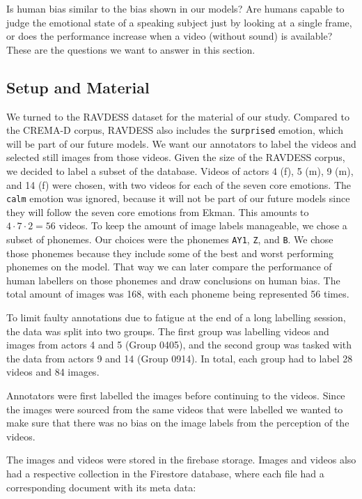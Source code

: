 Is human bias similar to the bias shown in our models? Are humans capable to judge the emotional state of a speaking subject just by looking at a single frame, or does the performance increase when a video (without sound) is available? These are the questions we want to answer in this section.

\subsection{Setup and Material}
We turned to the RAVDESS dataset \cite{livingstone2018ryerson} for the material of our study. Compared to the CREMA-D corpus, RAVDESS also includes the \texttt{surprised} emotion, which will be part of our future models. We want our annotators to label the videos and selected still images from those videos. Given the size of the RAVDESS corpus, we decided to label a subset of the database. Videos of actors 4 (f), 5 (m), 9 (m), and 14 (f) were chosen, with two videos for each of the seven core emotions. The \texttt{calm} emotion was ignored, because it will not be part of our future models since they will follow the seven core emotions from Ekman. This amounts to $4 \cdot 7 \cdot 2 = 56$ videos. To keep the amount of image labels manageable, we chose a subset of phonemes. Our choices were the phonemes \texttt{AY1}, \texttt{Z}, and \texttt{B}. We chose those phonemes because they include some of the best and worst performing phonemes on the model. That way we can later compare the performance of human labellers on those phonemes and draw conclusions on human bias. The total amount of images was 168, with each phoneme being represented 56 times.

To limit faulty annotations due to fatigue at the end of a long labelling session, the data was split into two groups. The first group was labelling videos and images from actors 4 and 5 (Group 0405), and the second group was tasked with the data from actors 9 and 14 (Group 0914). In total, each group had to label 28 videos and 84 images.

Annotators were first labelled the images before continuing to the videos. Since the images were sourced from the same videos that were labelled we wanted to make sure that there was no bias on the image labels from the perception of the videos.

The images and videos were stored in the firebase storage. Images and videos also had a respective collection in the Firestore database, where each file had a corresponding document with its meta data:

